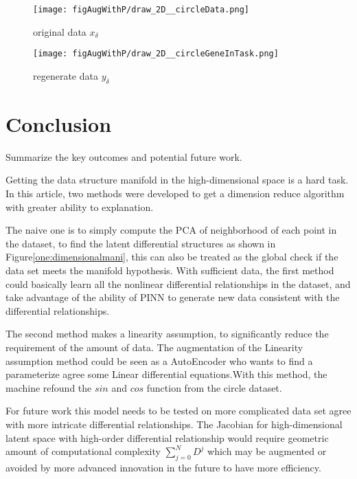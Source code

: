 \documentclass{article}
\begin{document}
\begin{figure}[ht!]
    \centering
    \begin{minipage}{0.45\textwidth}
        \centering
        \texttt{[image: figAugWithP/draw\_2D\_\_circleData.png]} %
        \caption{original data $x_\delta$}
        \label{fig:fig4}
    \end{minipage}\hfill
    \begin{minipage}{0.45\textwidth}
        \centering
        \texttt{[image: figAugWithP/draw\_2D\_\_circleGeneInTask.png]} %
        \caption{regenerate data $y_\delta$}
    \end{minipage}
\end{figure}

\section{Conclusion}
Summarize the key outcomes and potential future work.

Getting the data structure manifold in the
high-dimensional space is a hard task. In this article,
two methods were developed to get a dimension reduce
algorithm with greater ability to explanation.

The naive one
is to simply compute the PCA of neighborhood of each point
in the dataset, to find the latent differential structures
as shown in Figure\ref{one:dimensionalmani}, this can also
be treated as the global check if the data set meets the manifold hypothesis. With sufficient data, the first
method could basically learn all the nonlinear differential
relationships in the dataset, and take advantage of the ability of
PINN \cite[PINN]{raissi2017physics} to generate new data consistent
with the differential relationships.

The second method makes a linearity assumption, to significantly
reduce the requirement of the amount of data.
The augmentation of the Linearity assumption method could be
seen as a AutoEncoder who wants to find a parameterize agree
some Linear differential equations.With this method, the machine
refound the $sin$ and $cos$ function from the circle dataset.

For future work this model needs to be tested on more
complicated data set agree with more intricate differential relationships.
The Jacobian for high-dimensional latent space with high-order differential relationship
would require geometric amount of computational complexity $\sum_{j=0}^{N} D^{j}$ which may be augmented or
avoided by more advanced innovation in the future to have more efficiency.

\end{document}
